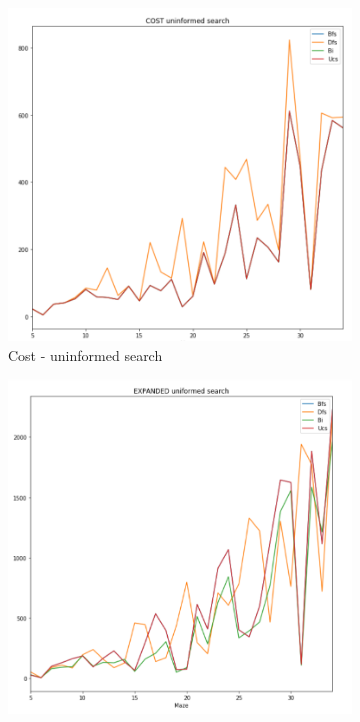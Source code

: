 \documentclass[a4paper,12pt]{report}
\begin{document}
\begin{figure}[h!]
  \centering
  \begin{subfigure}[b]{0.45\linewidth}
    \includegraphics[width=\linewidth]{pictures/variedMazeSize/4.png}
    \caption{Cost - uninformed search}
  \end{subfigure}
  \begin{subfigure}[b]{0.45\linewidth}
    \includegraphics[width=\linewidth]{pictures/variedMazeSize/3.png}

\end{subfigure}
\end{figure}
\end{document}

